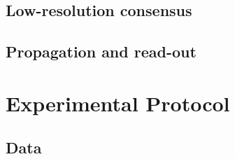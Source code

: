 \documentclass[runningheads]{llncs}
\begin{document}
\subsection{Low-resolution consensus}
\label{sec:consensus}

\subsection{Propagation and read-out}
\label{sec:propagation}

\section{Experimental Protocol}
\label{sec:protocol}

\subsection{Data}
\label{sec:data}
\end{document}
